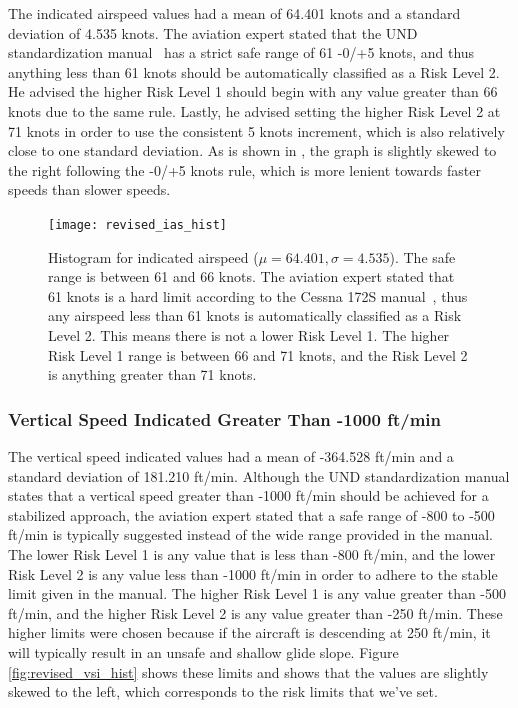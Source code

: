           The indicated airspeed values had a mean of 64.401 knots and a standard deviation of 4.535 knots.  The aviation expert stated that the UND standardization manual~\cite{und_flight_manual} has a strict safe range of 61 -0/+5 knots, and thus anything less than 61 knots should be automatically classified as a Risk Level 2.  He advised the higher Risk Level 1 should begin with any value greater than 66 knots due to the same rule.  Lastly, he advised setting the higher Risk Level 2 at 71 knots in order to use the consistent 5 knots increment, which is also relatively close to one standard deviation.  As is shown in , the graph is slightly skewed to the right following the -0/+5 knots rule, which is more lenient towards faster speeds than slower speeds.

		\begin{figure}
			\centering
            \texttt{[image: revised\_ias\_hist]}
            \caption{Histogram for indicated airspeed ($\mu = 64.401, \sigma = 4.535$).  The safe range is between 61 and 66 knots.  The aviation expert stated that 61 knots is a hard limit according to the Cessna 172S manual~\cite{und_poh}, thus any airspeed less than 61 knots is automatically classified as a Risk Level 2.  This means there is not a lower Risk Level 1.  The higher Risk Level 1 range is between 66 and 71 knots, and the Risk Level 2 is anything greater than 71 knots.}
            \label{fig:revised_ias_hist}
		\end{figure}



    \subsubsection{Vertical Speed Indicated Greater Than -1000 ft/min}
    
    	The vertical speed indicated values had a mean of -364.528 ft/min and a standard deviation of 181.210 ft/min.  Although the UND standardization manual states that a vertical speed greater than -1000 ft/min should be achieved for a stabilized approach, the aviation expert stated that a safe range of -800 to -500 ft/min is typically suggested instead of the wide range provided in the manual.  The lower Risk Level 1 is any value that is less than -800 ft/min, and the lower Risk Level 2 is any value less than -1000 ft/min in order to adhere to the stable limit given in the manual.  The higher Risk Level 1 is any value greater than -500 ft/min, and the higher Risk Level 2 is any value greater than -250 ft/min.  These higher limits were chosen because if the aircraft is descending at 250 ft/min, it will typically result in an unsafe and shallow glide slope.  Figure \ref{fig:revised_vsi_hist} shows these limits and shows that the values are slightly skewed to the left, which corresponds to the risk limits that we've set.

